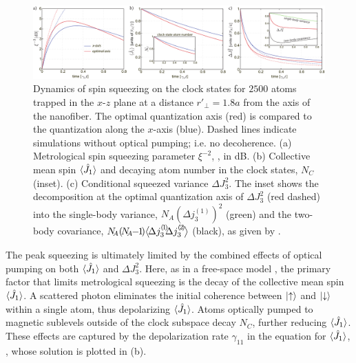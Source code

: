 \documentclass[aps,pra,twocolumn]{revtex4-1} %
\newcommand{\varz}{\Delta J_3^2}
\newcommand{\jx}{\hat{J}_1}
\begin{document}
\begin{figure}[t]
\includegraphics[scale=0.42]{./Fig4}
\caption{Dynamics of spin squeezing on the clock states for $2500$ atoms trapped in the $x$-$z$ plane at a distance $ r'\!_\perp=1.8a$ from the axis of the nanofiber. 
The optimal quantization axis (red) is compared to the quantization along the $x$-axis (blue). 
Dashed lines indicate simulations without optical pumping; i.e. no decoherence. 
(a) Metrological spin squeezing parameter $\xi^{-2}$, , in dB. 
(b) Collective mean spin $\langle{\hat{J}_1}\rangle$ and decaying atom number in the clock states, $N_C$ (inset).
(c) Conditional squeezed variance $\varz$. 
The inset shows the decomposition at the optimal quantization axis of $ \Delta J_3^2 $ (red dashed) into the single-body variance, $N\!\!_A (\!\Delta j_3^{(\!1\!)})^2$ (green) and the two-body covariance, $N\!\!_A(\!N\!\!_A\!\!-\!\!1\!)\expect{\!\Delta j_3^{(\!1\!)}\!\!\Delta j_3^{(\!2\!)}\!}$ (black), as given by .
}\label{Fig::Squeezing_Dynamics}
\end{figure}


The peak squeezing is ultimately limited by the combined effects of optical pumping on both $\expt{\jx}$ and $\varz$.  Here, as in a free-space model \cite{baragiola_three-dimensional_2014}, the primary factor that limits metrological squeezing is the decay of the collective mean spin $\expt{\jx}$. 
A scattered photon eliminates the initial coherence between $\lvert{\uparrow}\rangle$ and $\lvert{\downarrow}\rangle$ within a single atom, thus depolarizing $\expt{\jx}$.  
Atoms optically pumped to magnetic sublevels outside of the clock subspace decay $N_C$, further reducing $\expt{\jx}$. 
These effects are captured by the depolarization rate $\gamma_{11}$ in the equation for $\expt{\jx}$, , whose solution is plotted in (b).
  
\end{document}
